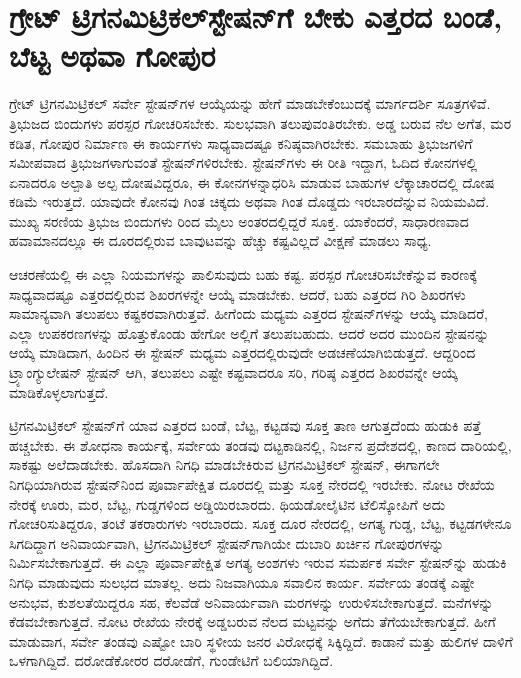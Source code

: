 
\chapter{ಗ್ರೇಟ್​ ಟ್ರಿಗನಮಿಟ್ರಿಕಲ್​ ಸ್ಟೇಷನ್​ಗೆ ಬೇಕು ಎತ್ತರದ ಬಂಡೆ, ಬೆಟ್ಟ ಅಥವಾ ಗೋಪುರ}

ಗ್ರೇಟ್​ ಟ್ರಿಗನಮಿಟ್ರಿಕಲ್​ ಸರ್ವೇ ಸ್ಟೇಷನ್​ಗಳ ಆಯ್ಕೆಯನ್ನು ಹೇಗೆ ಮಾಡಬೇಕೆಂಬುದಕ್ಕೆ ಮಾರ್ಗದರ್ಶಿ ಸೂತ್ರಗಳಿವೆ. ತ್ರಿಭುಜದ ಬಿಂದುಗಳು ಪರಸ್ಪರ ಗೋಚರಿಸಬೇಕು. ಸುಲಭವಾಗಿ ತಲುಪುವಂತಿರಬೇಕು. ಅಡ್ಡ ಬರುವ ನೆಲ ಅಗೆತ, ಮರ ಕಡಿತ, ಗೋಪುರ ನಿರ್ಮಾಣ ಈ ಕಾರ್ಯಗಳು ಸಾಧ್ಯವಾದಷ್ಟೂ ಕನಿಷ್ಠವಾಗಿರಬೇಕು. ಸಮಬಾಹು ತ್ರಿಭುಜಗಳಿಗೆ ಸಮೀಪವಾದ ತ್ರಿಭುಜಗಳಾಗುವಂತೆ ಸ್ಟೇಷನ್​ಗಳಿರಬೇಕು. ಸ್ಟೇಷನ್​ಗಳು ಈ ರೀತಿ ಇದ್ದಾಗ, ಓದಿದ ಕೋನಗಳಲ್ಲಿ ಏನಾದರೂ ಅಲ್ಪಾತಿ ಅಲ್ಪ ದೋಷವಿದ್ದರೂ, ಈ ಕೋನಗಳನ್ನಾಧರಿಸಿ ಮಾಡುವ ಬಾಹುಗಳ ಲೆಕ್ಕಾಚಾರದಲ್ಲಿ ದೋಷ ಕಡಿಮೆ ಇರುತ್ತದೆ. ಯಾವುದೇ ಕೋನವು  ಗಿಂತ ಚಿಕ್ಕದು ಅಥವಾ  ಗಿಂತ ದೊಡ್ಡದು ಇರಬಾರದೆನ್ನುವ ನಿಯಮವಿದೆ. ಮುಖ್ಯ ಸರಣಿಯ ತ್ರಿಭುಜ ಬಿಂದುಗಳು  ರಿಂದ  ಮೈಲು ಅಂತರದಲ್ಲಿದ್ದರೆ ಸೂಕ್ತ. ಯಾಕೆಂದರೆ, ಸಾಧಾರಣವಾದ ಹವಾಮಾನದಲ್ಲೂ ಈ ದೂರದಲ್ಲಿರುವ ಬಾವುಟವನ್ನು ಹೆಚ್ಚು ಕಷ್ಟವಿಲ್ಲದೆ ವೀಕ್ಷಣೆ ಮಾಡಲು ಸಾಧ್ಯ.

ಆಚರಣೆಯಲ್ಲಿ ಈ ಎಲ್ಲಾ ನಿಯಮಗಳನ್ನು ಪಾಲಿಸುವುದು ಬಹು ಕಷ್ಟ. ಪರಸ್ಪರ ಗೋಚರಿಸಬೇಕೆನ್ನುವ ಕಾರಣಕ್ಕೆ ಸಾಧ್ಯವಾದಷ್ಟೂ ಎತ್ತರದಲ್ಲಿರುವ ಶಿಖರಗಳನ್ನೇ ಆಯ್ಕೆ ಮಾಡಬೇಕು. ಆದರೆ, ಬಹು ಎತ್ತರದ ಗಿರಿ ಶಿಖರಗಳು ಸಾಮಾನ್ಯವಾಗಿ ತಲುಪಲು ಕಷ್ಟಕರವಾಗಿರುತ್ತವೆ. ಹೀಗೆಂದು ಮಧ್ಯಮ ಎತ್ತರದ ಸ್ಟೇಷನ್​ಗಳನ್ನು ಆಯ್ಕೆ ಮಾಡಿದರೆ, ಎಲ್ಲಾ ಉಪಕರಣಗಳನ್ನು ಹೊತ್ತುಕೊಂಡು ಹೇಗೋ ಅಲ್ಲಿಗೆ ತಲುಪಬಹುದು. ಆದರೆ ಅದರ ಮುಂದಿನ ಸ್ಟೇಷನನ್ನು ಆಯ್ಕೆ ಮಾಡಿದಾಗ, ಹಿಂದಿನ ಈ ಸ್ಟೇಷನ್​ ಮಧ್ಯಮ ಎತ್ತರದಲ್ಲಿರುವುದೇ ಅಡಚಣೆಯಾಗಿಬಿಡುತ್ತದೆ. ಆದ್ದರಿಂದ ಟ್ರ್ಯಾಂಗ್ಯುಲೇಷನ್​ ಸ್ಟೇಷನ್​ ಆಗಿ, ತಲುಪಲು ಎಷ್ಟೇ ಕಷ್ಟವಾದರೂ ಸರಿ, ಗರಿಷ್ಠ ಎತ್ತರದ ಶಿಖರವನ್ನೇ ಆಯ್ಕೆ ಮಾಡಿಕೊಳ್ಳಲಾಗುತ್ತದೆ.

ಟ್ರಿಗನಮಿಟ್ರಿಕಲ್​ ಸ್ಟೇಷನ್​ಗೆ ಯಾವ ಎತ್ತರದ ಬಂಡೆ, ಬೆಟ್ಟ, ಕಟ್ಟಡವು ಸೂಕ್ತ ತಾಣ ಆಗುತ್ತದೆಂದು ಹುಡುಕಿ ಪತ್ತೆ ಹಚ್ಚಬೇಕು. ಈ ಶೋಧನಾ ಕಾರ್ಯಕ್ಕೆ, ಸರ್ವೇಯ ತಂಡವು ದಟ್ಟಕಾಡಿನಲ್ಲಿ, ನಿರ್ಜನ ಪ್ರದೇಶದಲ್ಲಿ, ಕಾಣದ ದಾರಿಯಲ್ಲಿ, ಸಾಕಷ್ಟು ಅಲೆದಾಡಬೇಕು. ಹೊಸದಾಗಿ ನಿಗಧಿ ಮಾಡಬೇಕಿರುವ ಟ್ರಿಗನಮಿಟ್ರಿಕಲ್​ ಸ್ಟೇಷನ್​, ಈಗಾಗಲೇ ನಿಗಧಿಯಾಗಿರುವ ಸ್ಟೇಷನ್​ನಿಂದ ಪೂರ್ವಾಪೇಕ್ಷಿತ ದೂರದಲ್ಲಿ ಮತ್ತು ಸೂಕ್ತ ನೇರದಲ್ಲಿ ಇರಬೇಕು. ನೋಟ ರೇಖೆಯ ನೇರಕ್ಕೆ ಊರು, ಮರ, ಬೆಟ್ಟ, ಗುಡ್ಡಗಳಿಂದ ಅಡ್ಡಿಯಿರಬಾರದು. ಥಿಯಡೋಲೈಟಿನ ಟೆಲಿಸ್ಕೋಪಿಗೆ ಅದು ಗೋಚರಿಸುತಿದ್ದರೂ, ತಂಟೆ ತಕರಾರುಗಳು ಇರಬಾರದು. ಸೂಕ್ತ ದೂರ ನೇರದಲ್ಲಿ, ಅಗತ್ಯ ಗುಡ್ಡ, ಬೆಟ್ಟ, ಕಟ್ಟಡಗಳೇನೂ ಸಿಗದಿದ್ದಾಗ ಅನಿವಾರ್ಯವಾಗಿ, ಟ್ರಿಗನಮಿಟ್ರಿಕಲ್​ ಸ್ಟೇಷನ್​ಗಾಗಿಯೇ ದುಬಾರಿ ಖರ್ಚಿನ ಗೋಪುರಗಳನ್ನು ನಿರ್ಮಿಸಬೇಕಾಗುತ್ತದೆ. ಈ ಎಲ್ಲಾ ಪೂರ್ವಾಪೇಕ್ಷಿತ ಅಗತ್ಯ ಅಂಶಗಳು ಇರುವ ಸಮರ್ಪಕ ಸರ್ವೇ ಸ್ಟೇಷನ್​‌ನ್ನು ಹುಡುಕಿ ನಿಗಧಿ ಮಾಡುವುದು ಸುಲಭದ ಮಾತಲ್ಲ. ಅದು ನಿಜವಾಗಿಯೂ ಸವಾಲಿನ ಕಾರ್ಯ. ಸರ್ವೇಯ ತಂಡಕ್ಕೆ ಎಷ್ಟೇ ಅನುಭವ, ಕುಶಲತೆಯಿದ್ದರೂ ಸಹ, ಕೆಲವೆಡೆ ಅನಿವಾರ್ಯವಾಗಿ ಮರಗಳನ್ನು ಉರುಳಿಸಬೇಕಾಗುತ್ತದೆ. ಮನೆಗಳನ್ನು ಕೆಡವಬೇಕಾಗುತ್ತದೆ. ನೋಟ ರೇಖೆಯ ನೇರಕ್ಕೆ ಅಡ್ಡಬರುವ ನೆಲದ ಮಟ್ಟವನ್ನು ಅಗೆದು ತೆಗೆಯಬೇಕಾಗುತ್ತದೆ. ಹೀಗೆ ಮಾಡುವಾಗ, ಸರ್ವೇ ತಂಡವು ಎಷ್ಟೋ ಬಾರಿ ಸ್ಥಳೀಯ ಜನರ ವಿರೋಧಕ್ಕೆ ಸಿಕ್ಕಿದ್ದಿದೆ. ಕಾಡಾನೆ ಮತ್ತು ಹುಲಿಗಳ ದಾಳಿಗೆ ಒಳಗಾಗಿದ್ದಿದೆ. ದರೋಡೆಕೋರರ ದರೋಡೆಗೆ, ಗುಂಡೇಟಿಗೆ ಬಲಿಯಾಗಿದ್ದಿದೆ.

